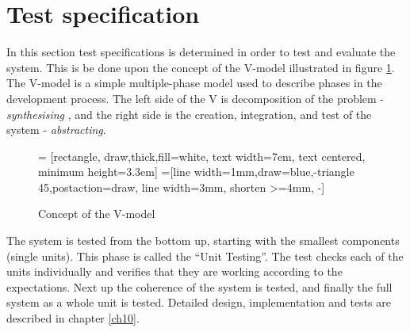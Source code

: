 \section{Test specification}\label{sec:testspec}
In this section test specifications is determined in order to test and evaluate the system. This is be done upon the concept of the V-model illustrated in figure \ref{fig:vmodel}. \cite{vmodel} The V-model is a simple multiple-phase model used to describe phases in the development process. The left side of the V is decomposition of the problem - \textit{synthesising} , and the right side is the creation, integration, and test of the system - \textit{abstracting}.
\begin{figure}[H]
\centering
{} = [rectangle, draw,thick,fill=white, 
    text width=7em, text centered, minimum height=3.3em]
=[line width=1mm,draw=blue,-triangle 45,postaction={draw, line width=3mm, shorten >=4mm, -}]
\caption{Concept of the V-model}
\label{fig:vmodel}
\end{figure}
%
The system is tested from the bottom up, starting with the smallest components (single units). This phase is called the ``Unit Testing''. The test checks each of the units individually and verifies that they are working according to the expectations. Next up the coherence of the system is tested, and finally the full system as a whole unit is tested. Detailed design, implementation and tests are described in chapter \ref{ch10}. \\
